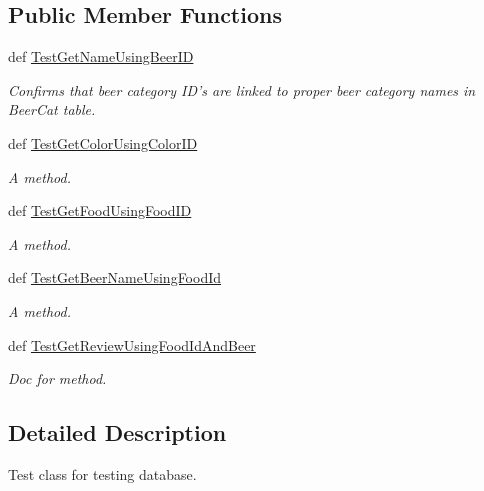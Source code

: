 \subsection*{Public Member Functions}
\begin{DoxyCompactItemize}
\item 
def \hyperlink{classdbDoxygen_1_1Test__SQL__DB_ae0d35ceea4631b889f44716107f4e52c}{Test\-Get\-Name\-Using\-Beer\-I\-D}
\begin{DoxyCompactList}\small\item\em Confirms that beer category I\-D's are linked to proper beer category names in Beer\-Cat table. \end{DoxyCompactList}\item 
def \hyperlink{classdbDoxygen_1_1Test__SQL__DB_a9f25d58b2c8ab5d6c6536a5dc7214a01}{Test\-Get\-Color\-Using\-Color\-I\-D}
\begin{DoxyCompactList}\small\item\em A method. \end{DoxyCompactList}\item 
def \hyperlink{classdbDoxygen_1_1Test__SQL__DB_a727a9b3476f267325da6a3d3f7442dc8}{Test\-Get\-Food\-Using\-Food\-I\-D}
\begin{DoxyCompactList}\small\item\em A method. \end{DoxyCompactList}\item 
def \hyperlink{classdbDoxygen_1_1Test__SQL__DB_a12f7edd9bde8e132987f8a095a419e9a}{Test\-Get\-Beer\-Name\-Using\-Food\-Id}
\begin{DoxyCompactList}\small\item\em A method. \end{DoxyCompactList}\item 
\hypertarget{classdbDoxygen_1_1Test__SQL__DB_a0b50d1b2d1920798ec59b26a0c538a29}{def \hyperlink{classdbDoxygen_1_1Test__SQL__DB_a0b50d1b2d1920798ec59b26a0c538a29}{Test\-Get\-Review\-Using\-Food\-Id\-And\-Beer}}\label{classdbDoxygen_1_1Test__SQL__DB_a0b50d1b2d1920798ec59b26a0c538a29}

\begin{DoxyCompactList}\small\item\em Doc for method. \end{DoxyCompactList}\end{DoxyCompactItemize}


\subsection{Detailed Description}
Test class for testing database. 


